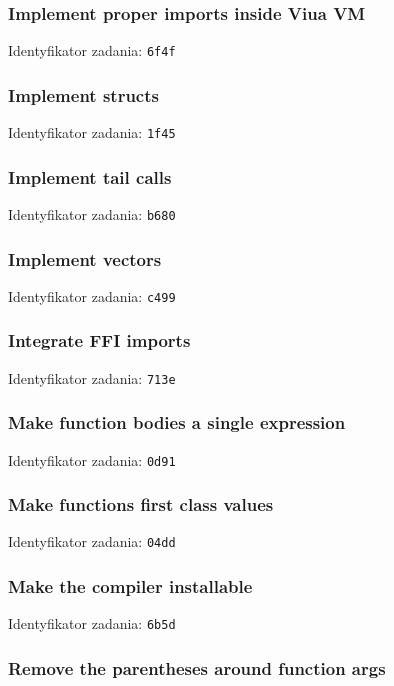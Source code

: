 \subsubsection{Implement proper imports inside Viua VM}

Identyfikator zadania: \texttt{6f4f}

\subsubsection{Implement structs}

Identyfikator zadania: \texttt{1f45}

\subsubsection{Implement tail calls}

Identyfikator zadania: \texttt{b680}

\subsubsection{Implement vectors}

Identyfikator zadania: \texttt{c499}

\subsubsection{Integrate FFI imports}

Identyfikator zadania: \texttt{713e}

\subsubsection{Make function bodies a single expression}

Identyfikator zadania: \texttt{0d91}

\subsubsection{Make functions first class values}

Identyfikator zadania: \texttt{04dd}

\subsubsection{Make the compiler installable}

Identyfikator zadania: \texttt{6b5d}

\subsubsection{Remove the parentheses around function args}

